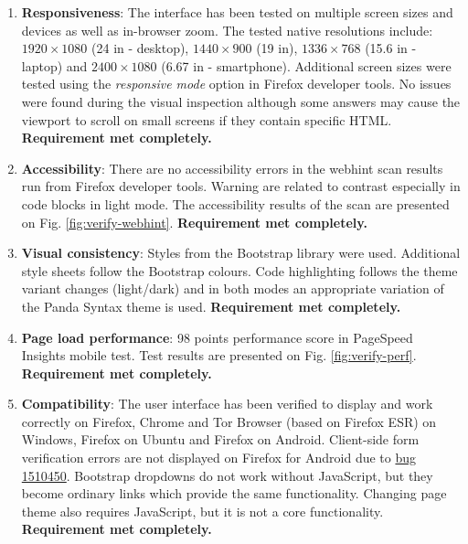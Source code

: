 \begin{enumerate}
	\item \textbf{Responsiveness}: The interface has been tested on multiple screen sizes and devices as well as in-browser zoom. The tested native resolutions include: $1920 \times 1080$ (24 in - desktop), $1440 \times 900$ (19 in), $1336 \times 768$ (15.6 in - laptop) and $2400 \times 1080$ (6.67 in - smartphone). Additional screen sizes were tested using the \textit{responsive mode} option in Firefox developer tools. No issues were found during the visual inspection although some answers may cause the viewport to scroll on small screens if they contain specific HTML. \textbf{Requirement met completely.}

	\item \textbf{Accessibility}: There are no accessibility errors in the webhint scan results run from Firefox developer tools. Warning are related to contrast especially in code blocks in light mode. The accessibility results of the scan are presented on Fig. \ref{fig:verify-webhint}. \textbf{Requirement met completely.}

	\item \textbf{Visual consistency}: Styles from the Bootstrap library were used. Additional style sheets follow the Bootstrap colours. Code highlighting follows the theme variant changes (light/dark) and in both modes an appropriate variation of the Panda Syntax theme is used. \textbf{Requirement met completely.}

	\item \textbf{Page load performance}: 98 points performance score in PageSpeed Insights mobile test. Test results are presented on Fig. \ref{fig:verify-perf}. \textbf{Requirement met completely.}

	\item \textbf{Compatibility}: The user interface has been verified to display and work correctly on Firefox, Chrome and Tor Browser (based on Firefox ESR) on Windows, Firefox on Ubuntu and Firefox on Android. Client-side form verification errors are not displayed on Firefox for Android due to \href{https://bugzilla.mozilla.org/show_bug.cgi?id=1510450}{bug 1510450}. Bootstrap dropdowns do not work without JavaScript, but they become ordinary links which provide the same functionality. Changing page theme also requires JavaScript, but it is not a core functionality. \textbf{Requirement met completely.}
\end{enumerate}

